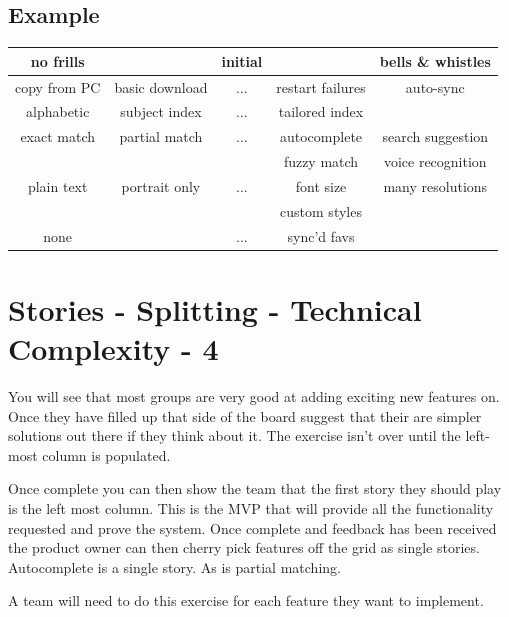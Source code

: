 \subsection*{Example}
\begin{tabular}{ c | c | c | c | c | }
 no frills &  & initial &  & bells \& whistles \\
  \hline                        
  copy from PC & basic download & ... & restart failures & auto-sync \\
    \hline                        
   alphabetic & subject index & ... & tailored index & \\
    \hline                        
  exact match & partial match & ... & autocomplete & search suggestion\\
  & & & fuzzy match & voice recognition \\
    \hline                        
  plain text  & portrait only & ... & font size & many resolutions\\ 
  & & & custom styles &  \\
    \hline                        
  none & & ... & sync'd favs & \\
  \hline  
\end{tabular}

\clearpage
\section*{Stories - Splitting - Technical Complexity - 4}
You will see that most groups are very good at adding exciting new features on. Once they have filled up that side of the board suggest that their are simpler solutions out there if they think about it. The exercise isn't over until the left-most column is populated.

Once complete you can then show the team that the first story they should play is the left most column. This is the MVP that will provide all the functionality requested and prove the system. Once complete and feedback has been received the product owner can then cherry pick features off the grid as single stories. Autocomplete is a single story. As is partial matching.

A team will need to do this exercise for each feature they want to implement.
